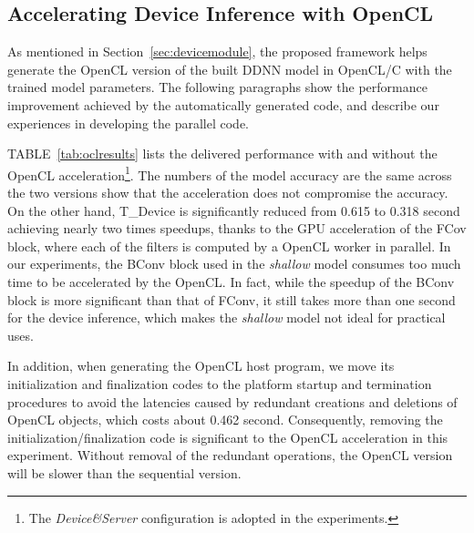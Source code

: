 \documentclass[format=acmsmall, review=false, screen=true]{acmart}
\def\tablename{TABLE}
\def\sectionname{Section}
\begin{document}

\subsection{Accelerating Device Inference with OpenCL}
\label{sec:oclacc}
As mentioned in \sectionname~\ref{sec:devicemodule}, the proposed framework helps generate the OpenCL version of the built DDNN model in OpenCL/C with the trained model parameters. The following paragraphs show the performance improvement achieved by the automatically generated code, and describe our experiences in developing the parallel code.

\tablename~\ref{tab:oclresults} lists the delivered performance with and without the OpenCL acceleration\footnote{The \emph{Device\&Server} configuration is adopted in the experiments.}. The numbers of the model accuracy are the same across the two versions show that the acceleration does not compromise the accuracy. On the other hand, T\_Device is significantly reduced from 0.615 to 0.318 second achieving nearly two times speedups, thanks to the GPU acceleration of the FCov block, where each of the filters is computed by a OpenCL worker in parallel. In our experiments, the BConv block used in the \emph{shallow} model consumes too much time to be accelerated by the OpenCL. In fact, while the speedup of the BConv block is more significant than that of FConv, it still takes more than one second for the device inference, which makes the \emph{shallow} model not ideal for practical uses.

In addition, when generating the OpenCL host program, we move its initialization and finalization codes to the platform startup and termination procedures to avoid the latencies caused by redundant creations and deletions of OpenCL objects, which costs about 0.462 second. Consequently, removing the initialization/finalization code is significant to the OpenCL acceleration in this experiment. Without removal of the redundant operations, the OpenCL version will be slower than the sequential version.
\end{document}
